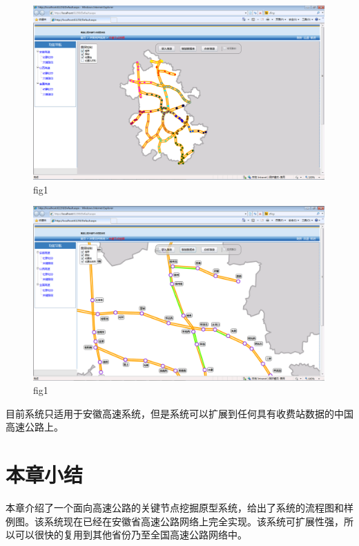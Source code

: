 		\begin{figure}[h]
		\centering
				\begin{minipage}{0.8\linewidth}
					\centering
					\includegraphics[width=4.4in]{picture/yuanxing1}
					\caption{fig1}
					\label{fig21}
				\end{minipage}%
		\end{figure}


		\begin{figure}[h]
		\centering
				\begin{minipage}{0.8\linewidth}
					\centering
					\includegraphics[width=4.4in]{picture/yuanxing2}
					\caption{fig1}
					\label{fig21}
				\end{minipage}%
		\end{figure}

		目前系统只适用于安徽高速系统，但是系统可以扩展到任何具有收费站数据的中国高速公路上。

	\section{本章小结}
		本章介绍了一个面向高速公路的关键节点挖掘原型系统，给出了系统的流程图和样例图。该系统现在已经在安徽省高速公路网络上完全实现。该系统可扩展性强，所以可以很快的复用到其他省份乃至全国高速公路网络中。

	